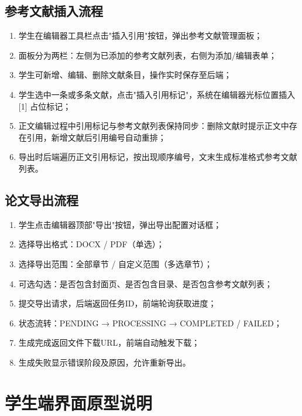 \documentclass{../softeng}
\begin{document}
\subsection{参考文献插入流程}

\begin{enumerate}
    \item 学生在编辑器工具栏点击"插入引用"按钮，弹出参考文献管理面板；
    \item 面板分为两栏：左侧为已添加的参考文献列表，右侧为添加/编辑表单；
    \item 学生可新增、编辑、删除文献条目，操作实时保存至后端；
    \item 学生选中一条或多条文献，点击"插入引用标记"，系统在编辑器光标位置插入 [1] 占位标记；
    \item 正文编辑过程中引用标记与参考文献列表保持同步：删除文献时提示正文中存在引用，新增文献后引用编号自动重排；
    \item 导出时后端遍历正文引用标记，按出现顺序编号，文末生成标准格式参考文献列表。
\end{enumerate}

\subsection{论文导出流程}

\begin{enumerate}
    \item 学生点击编辑器顶部"导出"按钮，弹出导出配置对话框；
    \item 选择导出格式：DOCX / PDF（单选）；
    \item 选择导出范围：全部章节 / 自定义范围（多选章节）；
    \item 可选勾选：是否包含封面页、是否包含目录、是否包含参考文献列表；
    \item 提交导出请求，后端返回任务ID，前端轮询获取进度；
    \item 状态流转：PENDING → PROCESSING → COMPLETED / FAILED；
    \item 生成完成返回文件下载URL，前端自动触发下载；
    \item 生成失败显示错误阶段及原因，允许重新导出。
\end{enumerate}

\section{学生端界面原型说明}
\end{document}
